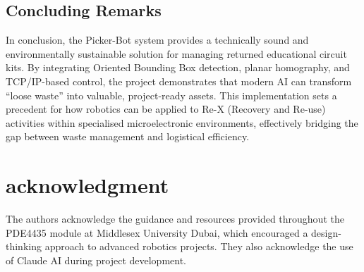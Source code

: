 \documentclass{MIPRO}
\begin{document}
\subsection{Concluding Remarks}

In conclusion, the Picker-Bot system provides a technically sound and environmentally sustainable solution for managing returned educational circuit kits. By integrating Oriented Bounding Box detection, planar homography, and TCP/IP-based control, the project demonstrates that modern AI can transform ``loose waste'' into valuable, project-ready assets. This implementation sets a precedent for how robotics can be applied to Re-X (Recovery and Re-use) activities within specialised microelectronic environments, effectively bridging the gap between waste management and logistical efficiency.

\section*{acknowledgment}

The authors acknowledge the guidance and resources provided throughout the PDE4435 module at Middlesex University Dubai, which encouraged a design-thinking approach to advanced robotics projects. They also acknowledge the use of Claude AI during project development.
\end{document}
